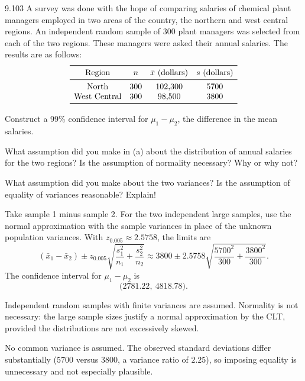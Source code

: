 \documentclass[11pt,oneside]{article}
\begin{document}
\begin{exercise}{9.103}
A survey was done with the hope of comparing salaries of chemical plant managers employed in two areas of the country, the northern and west central regions. An independent random sample of 300 plant managers was selected from each of the two regions. These managers were asked their annual salaries. The results are as follows:
\[
\begin{array}{cccc}\toprule
\text{Region} & n & \bar x\text{ (dollars)} & s\text{ (dollars)}\\\midrule
\text{North} & 300 & 102{,}300 & 5700\\
\text{West Central} & 300 & 98{,}500 & 3800\\
\bottomrule\end{array}
\]
\begin{exercisesubparts}
\item Construct a 99\% confidence interval for $\mu_1-\mu_2$, the difference in the mean salaries.
\item What assumption did you make in (a) about the distribution of annual salaries for the two regions? Is the assumption of normality necessary? Why or why not?
\item What assumption did you make about the two variances? Is the assumption of equality of variances reasonable? Explain!
\end{exercisesubparts}
\end{exercise}
\begin{solution}
\begin{exercisesubparts}
\item Take sample 1 minus sample 2. For the two independent large samples, use the normal approximation with the sample variances in place of the unknown population variances. With $z_{0.005}\approx2.5758$, the limits are
\[
(\bar x_1-\bar x_2)\pm z_{0.005}\sqrt{\frac{s_1^2}{n_1}+\frac{s_2^2}{n_2}}\approx 3800\pm 2.5758\sqrt{\frac{5700^2}{300}+\frac{3800^2}{300}}.
\]
The confidence interval for $\mu_1-\mu_2$ is 
\[
\boxed{\bigl(2781.22,\ 4818.78\bigr)}.
\]

\item Independent random samples with finite variances are assumed. Normality is not necessary: the large sample sizes justify a normal approximation by the CLT, provided the distributions are not excessively skewed.
\item No common variance is assumed. The observed standard deviations differ substantially ($5700$ versus $3800$, a variance ratio of $2.25$), so imposing equality is unnecessary and not especially plausible.
\end{exercisesubparts}
\end{solution}
\end{document}
